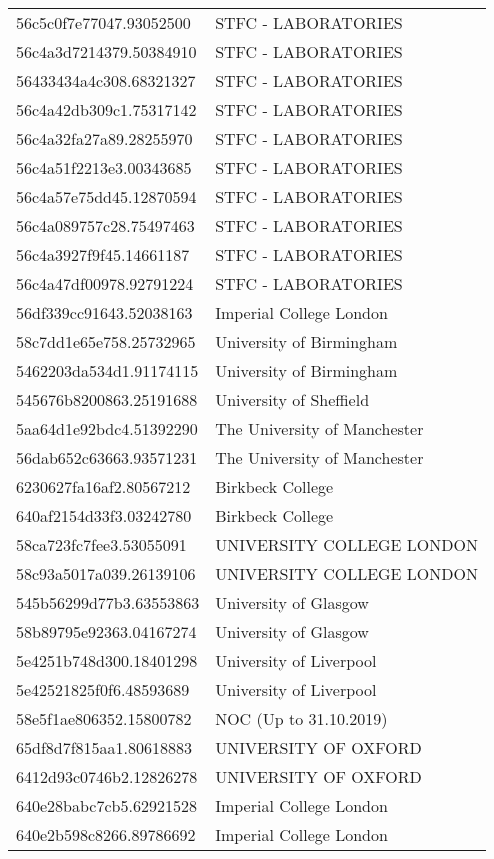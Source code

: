 \begin{tabular}{ll}
56c5c0f7e77047.93052500 & STFC - LABORATORIES \\
56c4a3d7214379.50384910 & STFC - LABORATORIES \\
56433434a4c308.68321327 & STFC - LABORATORIES \\
56c4a42db309c1.75317142 & STFC - LABORATORIES \\
56c4a32fa27a89.28255970 & STFC - LABORATORIES \\
56c4a51f2213e3.00343685 & STFC - LABORATORIES \\
56c4a57e75dd45.12870594 & STFC - LABORATORIES \\
56c4a089757c28.75497463 & STFC - LABORATORIES \\
56c4a3927f9f45.14661187 & STFC - LABORATORIES \\
56c4a47df00978.92791224 & STFC - LABORATORIES \\
56df339cc91643.52038163 & Imperial College London \\
58c7dd1e65e758.25732965 & University of Birmingham \\
5462203da534d1.91174115 & University of Birmingham \\
545676b8200863.25191688 & University of Sheffield \\
5aa64d1e92bdc4.51392290 & The University of Manchester \\
56dab652c63663.93571231 & The University of Manchester \\
6230627fa16af2.80567212 & Birkbeck College \\
640af2154d33f3.03242780 & Birkbeck College \\
58ca723fc7fee3.53055091 & UNIVERSITY COLLEGE LONDON \\
58c93a5017a039.26139106 & UNIVERSITY COLLEGE LONDON \\
545b56299d77b3.63553863 & University of Glasgow \\
58b89795e92363.04167274 & University of Glasgow \\
5e4251b748d300.18401298 & University of Liverpool \\
5e42521825f0f6.48593689 & University of Liverpool \\
58e5f1ae806352.15800782 & NOC (Up to 31.10.2019) \\
65df8d7f815aa1.80618883 & UNIVERSITY OF OXFORD \\
6412d93c0746b2.12826278 & UNIVERSITY OF OXFORD \\
640e28babc7cb5.62921528 & Imperial College London \\
640e2b598c8266.89786692 & Imperial College London \\

\end{tabular}
